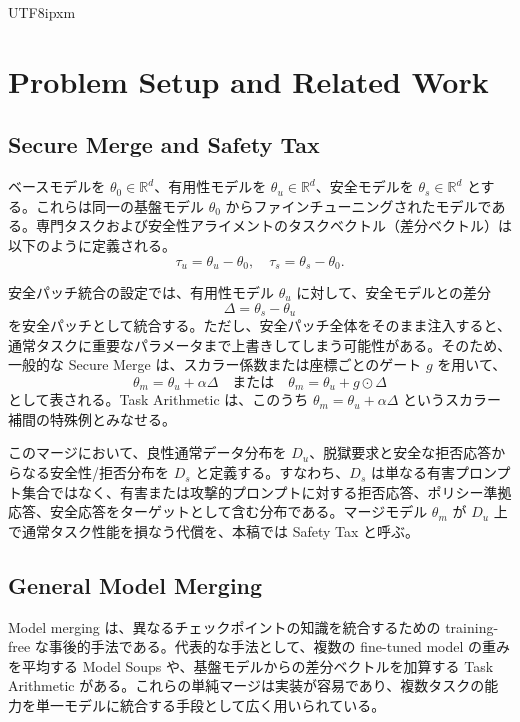 \documentclass[letterpaper]{article} %
\begin{document}
\begin{CJK*}{UTF8}{ipxm}
\section{Problem Setup and Related Work}

\subsection{Secure Merge and Safety Tax}
ベースモデルを $\theta_0 \in \mathbb{R}^d$、有用性モデルを $\theta_u \in \mathbb{R}^d$、安全モデルを $\theta_s \in \mathbb{R}^d$ とする。これらは同一の基盤モデル $\theta_0$ からファインチューニングされたモデルである。専門タスクおよび安全性アライメントのタスクベクトル（差分ベクトル）は以下のように定義される。
\begin{equation}
\tau_u = \theta_u - \theta_0, \quad \tau_s = \theta_s - \theta_0.
\end{equation}

安全パッチ統合の設定では、有用性モデル $\theta_u$ に対して、安全モデルとの差分
\begin{equation}
\Delta = \theta_s - \theta_u
\end{equation}
を安全パッチとして統合する。ただし、安全パッチ全体をそのまま注入すると、通常タスクに重要なパラメータまで上書きしてしまう可能性がある。そのため、一般的な Secure Merge は、スカラー係数または座標ごとのゲート $g$ を用いて、
\begin{equation}
\theta_m = \theta_u + \alpha \Delta \quad \text{または} \quad \theta_m = \theta_u + g \odot \Delta
\end{equation}
として表される。Task Arithmetic \citep{Ilharco2022EditingMW} は、このうち $\theta_m = \theta_u + \alpha \Delta$ というスカラー補間の特殊例とみなせる。

このマージにおいて、良性通常データ分布を $D_u$、脱獄要求と安全な拒否応答からなる安全性/拒否分布を $D_s$ と定義する。すなわち、$D_s$ は単なる有害プロンプト集合ではなく、有害または攻撃的プロンプトに対する拒否応答、ポリシー準拠応答、安全応答をターゲットとして含む分布である。マージモデル $\theta_m$ が $D_u$ 上で通常タスク性能を損なう代償を、本稿では Safety Tax と呼ぶ。

\subsection{General Model Merging}
Model merging は、異なるチェックポイントの知識を統合するための training-free な事後的手法である\citep{wortsman2022model, Ilharco2022EditingMW}。代表的な手法として、複数の fine-tuned model の重みを平均する Model Soups や、基盤モデルからの差分ベクトルを加算する Task Arithmetic がある。これらの単純マージは実装が容易であり、複数タスクの能力を単一モデルに統合する手段として広く用いられている。


\end{CJK*}
\end{document}
